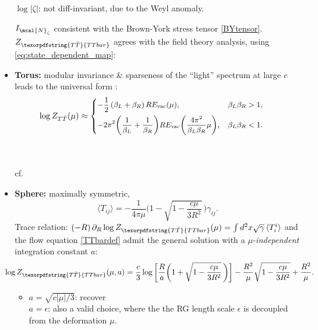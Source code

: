 \documentclass[10pt]{article}
\newcommand{\citations}[1]{{\footnotesize#1\par}}
\newcommand{\TTbar}{\texorpdfstring{\ensuremath{T\bar{T}}}{TTbar}\xspace}
\begin{document}
\begin{multicols}{3}
\begin{itemize}
	$\log |\zeta|$: not diff-invariant, due to the Weyl anomaly. 

	$I_{\mcal{N}_\zeta}$ consistent with the Brown-York stress \mbox{tensor} \eqref{BYtensor}.\\
	$Z_{\TTbar}$ agrees with the field theory analysis, using \eqref{eq:state_dependent_map}:

\item \textbf{Torus:} {modular invariance} \& sparseness of the ``light'' spectrum at large $c$ leads to the universal form :
	\begin{equation*}\small
	\hspace{-1.5em}
		\log   Z_{T\bar T}(\mu)  \approx \left\{ \begin{aligned}
		& {-\frac{1}{2}}\,(\beta_L + \beta_R)\, RE_{\text{vac}}(\mu),  &\beta_L \beta_R > 1, \\
		& {-2 \pi^2 \bigg(\frac{1}{\beta_L} + \frac{1}{\beta_R}\bigg)  RE_{\text{vac}}\bigg(\frac{4\pi^2}{\beta_L \beta_R} \mu \bigg)},  &\beta_L\beta_R < 1. %
		 \end{aligned} \right. %
	\end{equation*}
	\citations{\noindent%
		\textcite{Datta:2018thy}\\
		\textcite{Apolo:2023aho}\\
		cf.~\textcite{Hartman:2014oaa}
	}

\item \textbf{Sphere:} maximally symmetric,\\ \mbox{\footnotesize \textcite{Donnelly:2018bef}}
	\begin{equation}
		\langle T_{ij}\rangle = -\frac{1}{4\pi\mu} \bigg(1-\sqrt{1-\frac{c\mu}{3R^2}}\, \bigg)  \gamma_{ij}.
	\end{equation}
Trace relation: \mbox{$
(-R)\,\partial_R \log Z_{\TTbar}(\mu)=\int d^2x\sqrt{\gamma}\,\langle T^i_i \rangle
$} and the flow equation \eqref{TTbardef} 
admit the general \mbox{solution} with a $\mu$-\textit{independent} integration constant $a$:
	\begin{equation*}\small
	\hspace{-1.35em}
		\log Z_{\TTbar}(\mu, a) = \frac{c}{3} \log \bigg[\frac{R}{a}   \bigg(1+\sqrt{1-\frac{c \mu }{3  R^2}}\, \bigg) \bigg] - \frac{R^2}{\mu}  \sqrt{1-\frac{c \mu }{3 R^2}} + \frac{R^2}{\mu}. %
	\end{equation*}
	\begin{itemize}%
	\item $a = \sqrt{c|\mu|/3}$: recover {\footnotesize \textcite{Donnelly:2018bef}} \\
	$a = \epsilon$: also a valid choice, where the the RG length scale $\epsilon$ is decoupled from the deformation $\mu$.
	

\end{itemize}
\end{itemize}
\end{multicols}
\end{document}
